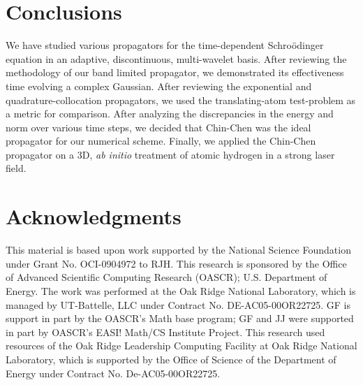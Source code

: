 \documentclass[review,letterpaper]{elsarticle}
\begin{document}
\section{Conclusions}
We have studied various propagators for the time-dependent Schro\"odinger equation in an adaptive,
discontinuous, multi-wavelet basis. After reviewing the methodology of our band limited propagator,
we demonstrated its effectiveness time evolving a complex Gaussian. After reviewing
the exponential and quadrature-collocation propagators, we used the translating-atom test-problem
as a metric for comparison.
After analyzing the discrepancies in the energy and norm over various time steps, we
decided that Chin-Chen was the ideal propagator for our numerical scheme.
Finally, we applied the Chin-Chen propagator on a 3D, \emph{ab initio} treatment of atomic
hydrogen in a strong laser field.

\section{Acknowledgments}
This material is based upon work supported by the National Science Foundation under Grant No. OCI-0904972 to RJH.
This research is sponsored by the Office of Advanced Scientific Computing Research (OASCR); U.S. Department of Energy. The work was performed at the Oak Ridge National Laboratory, which is managed by UT-Battelle, LLC under Contract No. DE-AC05-00OR22725.
GF is support in part by the OASCR's Math base program; GF and JJ were supported in part by OASCR's EASI! Math/CS Institute Project.
This research used resources of the Oak Ridge Leadership Computing Facility at Oak Ridge National Laboratory, which is supported by the Office of Science of the Department of Energy under Contract No. De-AC05-00OR22725.



\end{document}
